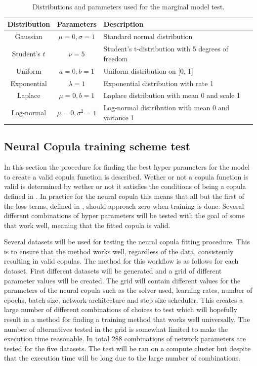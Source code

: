 \begin{table}[h]
    \centering
    \caption{Distributions and parameters used for the marginal model test.}
    \begin{tabular}{@{}ccl@{}}
        Distribution & Parameters & Description \\
        \toprule
        Gaussian & $\mu=0, \sigma=1$ & Standard normal distribution \\ 
        Student's $t$ & $\nu=5$ & Student's t-distribution with 5 degrees of freedom \\ 
        Uniform & $a=0, b=1$ & Uniform distribution on [0, 1] \\ 
        Exponential & $\lambda=1$ & Exponential distribution with rate 1 \\ 
        Laplace & $\mu=0, b=1$ & Laplace distribution with mean 0 and scale 1 \\ 
        Log-normal & $\mu=0, \sigma^2=1$ & Log-normal distribution with mean 0 and variance 1 \\ 
    \end{tabular}
    \label{tab:distributions}
\end{table}



\subsection{Neural Copula training scheme test}
In this section the procedure for finding the best hyper parameters for the model to create a valid copula function is described. Wether or not a copula function is valid is determined by wether or not it satisfies the conditions of being a copula defined in . In practice for the neural copula this means that all but the first of the loss terms, defined in , should approach zero when training is done. Several different combinations of hyper parameters will be tested with the goal of some that work well, meaning that the fitted copula is valid.

Several datasets will be used for testing the neural copula fitting procedure. This is to ensure that the method works well, regardless of the data, consistently resulting in valid copulas. The method for this workflow is as follows for each dataset. First different datasets will be generated  and a grid of different parameter values will be created. The grid will contain different values for the parameters of the neural copula such as the solver used, learning rates, number of epochs, batch size, network architecture and step size scheduler. This creates a large number of different combinations of choices to test which will hopefully result in a method for finding a training method that works well universally. The number of alternatives tested in the grid is somewhat limited to make the execution time reasonable. In total 288 combinations of network parameters are tested for the five datasets. The test will be ran on a compute cluster but despite that the execution time will be long due to the large number of combinations. 

